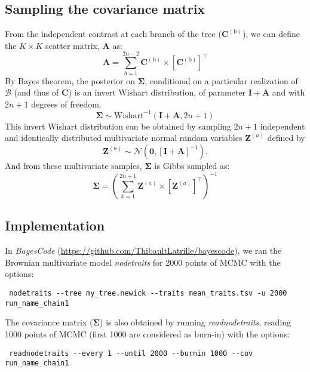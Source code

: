 \documentclass{article}
\newcommand{\MultiplyMatrix}{\times}
\newcommand{\UniDimArray}[1]{\bm{#1}}
\newcommand{\BiDimArray}[1]{\bm{#1}}
\newcommand{\tr}{^{\intercal}}
\newcommand{\inv}{^{-1}}
\newcommand{\NbrTaxa}{n}
\newcommand{\branch}{\text{b}}
\newcommand{\branchexp}{^{(\branch)}}
\newcommand{\Nbranch}{2 \NbrTaxa - 2}
\newcommand{\WishartPostDf}{2 \NbrTaxa + 1}
\newcommand{\Ntrait}{K}
\newcommand{\contrast}{\UniDimArray{C}}
\newcommand{\Covariancematrix}{\Sigma}
\newcommand{\CovarianceMatrix}{\BiDimArray{\Covariancematrix}}
\newcommand{\Identitymatrix}{\BiDimArray{I}}
\newcommand{\brownian}{\mathcal{B}}
\newcommand{\Scattermatrix}{\BiDimArray{A}}
\newcommand{\Multivariate}{\UniDimArray{Z}}
\newcommand{\indice}{a}
\newcommand{\indiceexp}{^{(\indice)}}
\newcommand{\vecZero}{\UniDimArray{0}}
\begin{document}
\subsection{Sampling the covariance matrix}
From the independent contrast at each branch of the tree ($\contrast\branchexp$), we can define the $\Ntrait \times \Ntrait$ scatter matrix, $\Scattermatrix$ as:
\begin{equation}
    \Scattermatrix = \sum\limits_{b=1}^{\Nbranch} \contrast\branchexp \MultiplyMatrix \left[\contrast\branchexp\right]\tr
\end{equation}
By Bayes theorem, the {posterior} on $\CovarianceMatrix$, conditional on a particular realization of $\brownian$ (and thus of $\contrast$) is an invert Wishart distribution, of parameter $\Identitymatrix + \Scattermatrix$ and with $\WishartPostDf$ degrees of freedom.
\begin{equation}
    \CovarianceMatrix \sim \text{Wishart}^{-1}\left( \Identitymatrix + \Scattermatrix, \WishartPostDf\right)
\end{equation}
This invert Wishart distribution can be obtained by sampling $\WishartPostDf$ independent and identically distributed multivariate normal random variables $\Multivariate\indiceexp$ defined by
\begin{equation}
    \Multivariate\indiceexp \sim \mathcal{N} \left( \vecZero, \left[ \Identitymatrix + \Scattermatrix\right]^{-1} \right).
\end{equation}
And from these multivariate samples, $\CovarianceMatrix$ is Gibbs sampled as:
\begin{equation}
    \CovarianceMatrix = \left( \sum\limits_{k=1}^{\WishartPostDf} \Multivariate\indiceexp \MultiplyMatrix  \left[\Multivariate\indiceexp \right] \tr \right)\inv
\end{equation}

\subsection{Implementation}
\label{sec:site-specific-mutation-selection-codon-models}
In \textit{BayesCode} (\url{https://github.com/ThibaultLatrille/bayescode}), we ran the Brownian multivariate model \textit{nodetraits} for 2000 points of MCMC with the options:
\begin{scriptsize}
    \begin{verbatim}
 nodetraits --tree my_tree.newick --traits mean_traits.tsv -u 2000 run_name_chain1
    \end{verbatim}
\end{scriptsize}
The covariance matrix ($\CovarianceMatrix$) is also obtained by running \textit{readnodetraits}, reading 1000 points of MCMC (first 1000 are considered as burn-in) with the options:
\begin{scriptsize}
    \begin{verbatim}
 readnodetraits --every 1 --until 2000 --burnin 1000 --cov run_name_chain1
    \end{verbatim}
\end{scriptsize}
\end{document}
